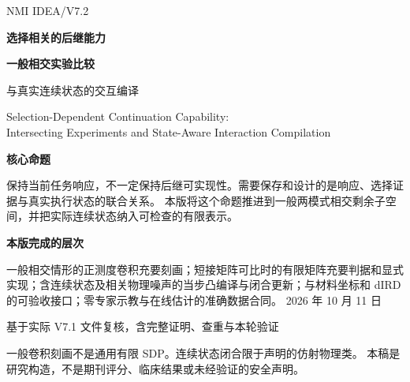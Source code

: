 \documentclass[UTF8,fontset=fandol,11pt,a4paper]{ctexart}
\theoremstyle{definition}\newtheorem{definition}[theorem]{定义}\newtheorem{assumption}[theorem]{条件}
\numberwithin{equation}{section}
\begin{document}
\begin{titlepage}
\vspace*{9mm}
{\Large\sffamily\color{teal}NMI IDEA\quad /\quad V7.2}\par
\vspace{14mm}
{\Huge\bfseries\color{ink}选择相关的后继能力}\par
\vspace{5mm}
{\LARGE\bfseries\color{ink}一般相交实验比较\par 与真实连续状态的交互编译}\par
\vspace{6mm}
{\large\color{muted}Selection-Dependent Continuation Capability:\\
Intersecting Experiments and State-Aware Interaction Compilation}\par
\vspace{11mm}
\begin{keybox}
\textbf{核心命题}\par
保持当前任务响应，不一定保持后继可实现性。需要保存和设计的是响应、选择证据与真实执行状态的联合关系。
本版将这个命题推进到一般两模式相交剩余子空间，并把实际连续状态纳入可检查的有限表示。
\end{keybox}
\vspace{5mm}
\textbf{本版完成的层次}\par
一般相交情形的正测度卷积充要刻画；短接矩阵可比时的有限矩阵充要判据和显式实现；含连续状态及相关物理噪声的当步凸编译与闭合更新；与材料坐标和 dIRD 的可验收接口；零专家示教与在线估计的准确数据合同。
\vfill
{\large 2026 年 10 月 11 日}\par
{\color{muted}基于实际 V7.1 文件复核，含完整证明、查重与本轮验证}\par
\vspace{5mm}
{\small 一般卷积刻画不是通用有限 SDP。连续状态闭合限于声明的仿射物理类。
本稿是研究构造，不是期刊评分、临床结果或未经验证的安全声明。}
\end{titlepage}
\end{document}
